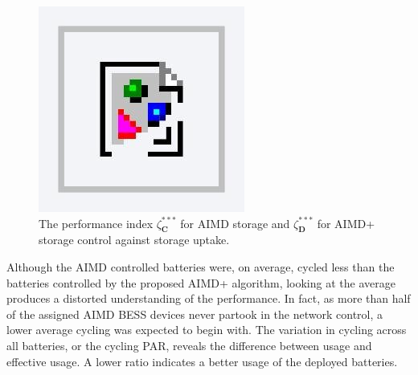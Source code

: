 \begin{figure}\centering
 \includegraphics{foo}
 \caption{The performance index $\zeta_\textbf{C}^{***}$ for AIMD storage and $\zeta_\textbf{D}^{***}$ for AIMD+ storage control against storage uptake.}
 \label{fig-storage-par}
\end{figure}

Although the AIMD controlled batteries were, on average, cycled less than the batteries controlled by the proposed AIMD+ algorithm, looking at the average produces a distorted understanding of the performance. In fact, as more than half of the assigned AIMD BESS devices never partook in the network control, a lower average cycling was expected to begin with. The variation in cycling across all batteries, or the cycling PAR, reveals the difference between usage and effective usage. A lower ratio indicates a better usage of the deployed batteries.